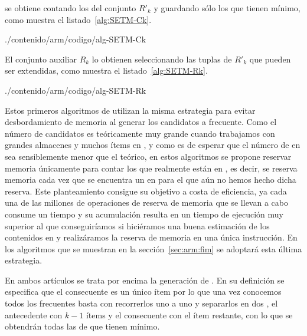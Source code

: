 \aprioriC se obtiene contando los \itemsets del conjunto $R'_k$ y guardando sólo los que tienen \soporte mínimo, como muestra el listado~\ref{alg:SETM-Ck}.


                {./contenido/arm/codigo/alg-SETM-Ck}

El conjunto auxiliar $R_k$ lo obtienen seleccionando las tuplas de $R'_k$ que pueden ser extendidas, como muestra el listado~\ref{alg:SETM-Rk}.

                {./contenido/arm/codigo/alg-SETM-Rk}

Estos primeros algoritmos de \arm utilizan la misma estrategia para evitar desbordamiento de memoria al generar los candidatos a \itemset frecuente. Como el número de candidatos es teóricamente muy grande cuando trabajamos con grandes almacenes \D y muchos ítems en \I, y como es de esperar que el número de \itemsets en \D sea sensiblemente menor que el teórico, en estos algoritmos se propone reservar memoria únicamente para contar los \itemsets que realmente están en \D, es decir, se reserva memoria cada vez que se encuentra un \itemset en \D para el que aún no hemos hecho dicha reserva. Este planteamiento consigue su objetivo a costa de eficiencia, ya cada una de las millones de operaciones de reserva de memoria que se llevan a cabo consume un tiempo y su acumulación resulta en un tiempo de ejecución muy superior al que conseguiríamos si hiciéramos una buena estimación de los \itemsets contenidos en \D y realizáramos la reserva de memoria en una única instrucción. En los algoritmos que se muestran en la sección~\ref{sec:arm:fim} se adoptará esta última estrategia.

En ambos artículos se trata por encima la generación de \ars. En su definición se especifica que el consecuente es un único ítem por lo que una vez conocemos todos los \kitemsets frecuentes basta con recorrerlos uno a uno y separarlos en dos \itemsets, el antecedente con $k-1$ ítems y el consecuente con el ítem restante, con lo que se obtendrán todas las \ARs de \D que tienen \soporte mínimo.